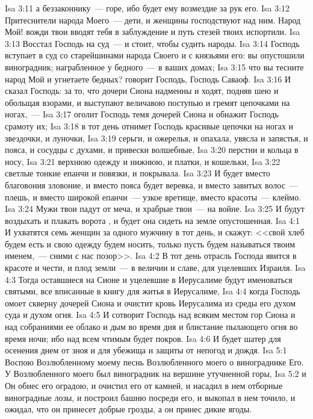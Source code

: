 \vs Isa 3:11 а беззаконнику~--- горе, ибо будет ему возмездие за  рук его.
\vs Isa 3:12 Притеснители народа Моего~--- дети, и женщины господствуют над ним. Народ Мой! вожди твои вводят тебя в заблуждение и путь стезей твоих испортили.
\rsbpar\vs Isa 3:13 Восстал Господь на суд~--- и стоит, чтобы судить народы.
\vs Isa 3:14 Господь вступает в суд со старейшинами народа Своего и с князьями его: вы опустошили виноградник; награбленное у бедного~--- в ваших домах;
\vs Isa 3:15 что вы тесните народ Мой и угнетаете бедных? говорит Господь, Господь Саваоф.
\rsbpar\vs Isa 3:16 И сказал Господь: за то, что дочери Сиона надменны и ходят, подняв шею и обольщая взорами, и выступают величавою поступью и гремят цепочками на ногах,~---
\vs Isa 3:17 оголит Господь темя дочерей Сиона и обнажит Господь срамоту их;
\vs Isa 3:18 в тот день отнимет Господь красивые цепочки на ногах и звездочки, и луночки,
\vs Isa 3:19 серьги, и ожерелья, и опахала, увясла и запястья, и пояса, и сосудцы с духами, и привески волшебные,
\vs Isa 3:20 перстни и кольца в носу,
\vs Isa 3:21 верхнюю одежду и нижнюю, и платки, и кошельки,
\vs Isa 3:22 светлые тонкие епанчи и повязки, и покрывала.
\vs Isa 3:23 И будет вместо благовония зловоние, и вместо пояса будет веревка, и вместо завитых волос~--- плешь, и вместо широкой епанчи~--- узкое вретище, вместо красоты~--- клеймо.
\vs Isa 3:24 Мужи твои падут от меча, и храбрые твои~--- на войне.
\vs Isa 3:25 И будут воздыхать и плакать ворота , и будет она сидеть на земле опустошенная.
\vs Isa 4:1 И ухватятся семь женщин за одного мужчину в тот день, и скажут: <<свой хлеб будем есть и свою одежду будем носить, только пусть будем называться твоим именем,~--- сними с нас позор>>.
\rsbpar\vs Isa 4:2 В тот день отрасль Господа явится в красоте и чести, и плод земли~--- в величии и славе, для уцелевших  Израиля.
\vs Isa 4:3 Тогда оставшиеся на Сионе и уцелевшие в Иерусалиме будут именоваться святыми, все вписанные в книгу для житья в Иерусалиме,
\vs Isa 4:4 когда Господь омоет скверну дочерей Сиона и очистит кровь Иерусалима из среды его духом суда и духом огня.
\vs Isa 4:5 И сотворит Господь над всяким местом гор Сиона и над собраниями ее облако и дым во время дня и блистание пылающего огня во время ночи; ибо над всем чтимым будет покров.
\vs Isa 4:6 И будет шатер для осенения днем от зноя и для убежища и защиты от непогод и дождя.
\vs Isa 5:1 Воспою Возлюбленному моему песнь Возлюбленного моего о винограднике Его. У Возлюбленного моего был виноградник на вершине утучненной горы,
\vs Isa 5:2 и Он обнес его оградою, и очистил его от камней, и насадил в нем отборные виноградные лозы, и построил башню посреди его, и выкопал в нем точило, и ожидал, что он принесет добрые грозды, а он принес дикие ягоды.
